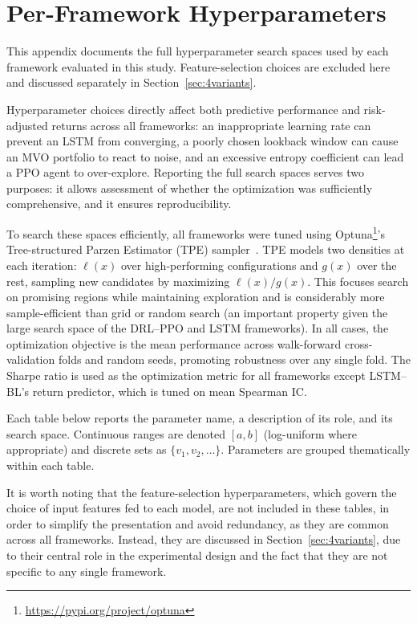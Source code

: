 \chapter{Per-Framework Hyperparameters}
\label{chap:hyperparameters}

\begin{introduction}
This appendix documents the full hyperparameter search spaces used by each framework evaluated in this study. Feature-selection choices are excluded here and discussed separately in Section~\ref{sec:4variants}.
\end{introduction}

Hyperparameter choices directly affect both predictive performance and risk-adjusted returns across all frameworks: an inappropriate learning rate can prevent an LSTM from converging, a poorly chosen lookback window can cause an MVO portfolio to react to noise, and an excessive entropy coefficient can lead a PPO agent to over-explore. Reporting the full search spaces serves two purposes: it allows assessment of whether the optimization was sufficiently comprehensive, and it ensures reproducibility.

To search these spaces efficiently, all frameworks were tuned using Optuna\footnote{\url{https://pypi.org/project/optuna}}'s Tree-structured Parzen Estimator (TPE) sampler~\cite{optuna}. TPE models two densities at each iteration: $\ell(x)$ over high-performing configurations and $g(x)$ over the rest, sampling new candidates by maximizing $\ell(x)/g(x)$. This focuses search on promising regions while maintaining exploration and is considerably more sample-efficient than grid or random search (an important property given the large search space of the DRL--PPO and LSTM frameworks). In all cases, the optimization objective is the mean performance across walk-forward cross-validation folds and random seeds, promoting robustness over any single fold. The Sharpe ratio is used as the optimization metric for all frameworks except LSTM--BL's return predictor, which is tuned on mean Spearman IC.

Each table below reports the parameter name, a description of its role, and its search space. Continuous ranges are denoted $[a,b]$ (log-uniform where appropriate) and discrete sets as $\{v_1, v_2, \ldots\}$. Parameters are grouped thematically within each table.

It is worth noting that the feature-selection hyperparameters, which govern the choice of input features fed to each model, are not included in these tables, in order to simplify the presentation and avoid redundancy, as they are common across all frameworks. Instead, they are discussed in Section~\ref{sec:4variants}, due to their central role in the experimental design and the fact that they are not specific to any single framework.

